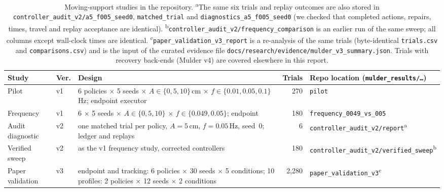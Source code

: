 \begin{table}[htbp]
\centering
\small
\begin{tabularx}{\linewidth}{@{}l l X r l@{}}
\toprule
Study & Ver. & Design & Trials & Repo location (\texttt{mulder\_\allowbreak{}results/\allowbreak{}\ldots}) \\
\midrule
Pilot & v1 & 6 policies $\times$ 5 seeds $\times$ $A\in\{0,5,10\}$\,cm $\times$ $f\in\{0.01,0.05,0.1\}$\,Hz; endpoint executor & 270 & \texttt{pilot} \\
Frequency & v1 & 6 $\times$ 5 seeds $\times$ $A\in\{0,5,10\}$ $\times$ $f\in\{0.049,0.05\}$; endpoint & 180 & \texttt{frequency\_\allowbreak{}0049\_\allowbreak{}vs\_\allowbreak{}005} \\
Audit diagnostic & v2 & one matched trial per policy, $A=5$\,cm, $f=0.05$\,Hz, seed~0; ledger and replays & 6 & \texttt{controller\_\allowbreak{}audit\_\allowbreak{}v2/\allowbreak{}report}\textsuperscript{a} \\
Verified sweep & v2 & as the v1 frequency study, corrected controllers & 180 & \texttt{controller\_\allowbreak{}audit\_\allowbreak{}v2/\allowbreak{}verified\_\allowbreak{}sweep}\textsuperscript{b} \\
Paper validation & v3 & endpoint and tracking: 6 policies $\times$ 30 seeds $\times$ 5 conditions; 10 profiles: 2 policies $\times$ 12 seeds $\times$ 2 conditions & 2{,}280 & \texttt{paper\_\allowbreak{}validation\_\allowbreak{}v3}\textsuperscript{c} \\
\bottomrule
\end{tabularx}
\caption{Moving-support studies in the repository. \textsuperscript{a}The same six trials and replay
outcomes are also stored in \texttt{controller\_\allowbreak{}audit\_\allowbreak{}v2/\allowbreak{}a5\_\allowbreak{}f005\_\allowbreak{}seed0}, \texttt{matched\_\allowbreak{}trial} and
\texttt{diagnostics\_\allowbreak{}a5\_\allowbreak{}f005\_\allowbreak{}seed0} (we checked that completed actions, repairs, times, travel and replay
acceptance are identical). \textsuperscript{b}\texttt{controller\_\allowbreak{}audit\_\allowbreak{}v2/\allowbreak{}frequency\_\allowbreak{}comparison} is an
earlier run of the same sweep; all columns except wall-clock times are identical.
\textsuperscript{c}\texttt{paper\_\allowbreak{}validation\_\allowbreak{}v3\_\allowbreak{}report} is a re-analysis of the same trials (byte-identical
\texttt{trials.csv} and \texttt{comparisons.csv}) and is the input of the curated evidence file
\texttt{docs/\allowbreak{}research/\allowbreak{}evidence/\allowbreak{}mulder\_\allowbreak{}v3\_\allowbreak{}summary.json}. Trials with recovery back-ends (Mulder v4) are
covered elsewhere in this report.}
\label{tab:mulder-versions}
\end{table}

